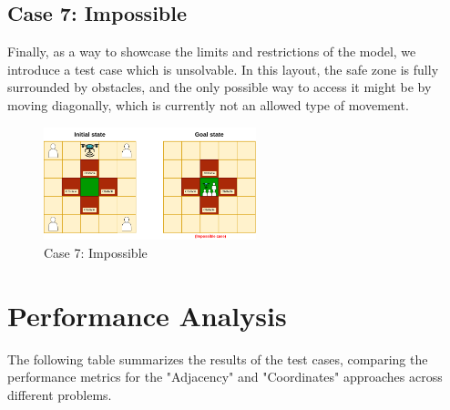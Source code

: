 \documentclass{article}
\begin{document}
\FloatBarrier

\subsection{Case 7: Impossible}

Finally, as a way to showcase the limits and restrictions of the model, we introduce a test case which is unsolvable. In this layout, the safe zone is fully surrounded by obstacles, and the only possible way to access it might be by moving diagonally, which is currently not an allowed type of movement.

\begin{figure}[ht]
    \centering
    \includegraphics[width=0.55\textwidth]{assets/problem-7-impossible.drawio.png} %
    \caption{Case 7: Impossible}
    \label{fig:initial-state-impossible}
\end{figure}
\FloatBarrier

\section{Performance Analysis}

The following table summarizes the results of the test cases, comparing the performance metrics for the "Adjacency" and "Coordinates" approaches across different problems.
\end{document}
